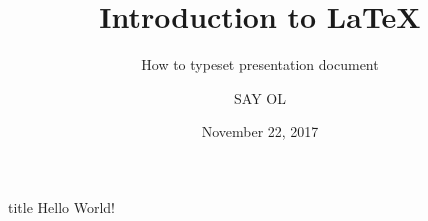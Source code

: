 \documentclass{beamer}
\title[I2L]{Introduction to \LaTeX{}}
\subtitle[Beamer]{How to typeset presentation document}
\author[SAY]{SAY OL}
\institute[KhTUG]{Khmer TeX Users Group}
\date[11/22/2017]{November 22, 2017}
\begin{document}
	\begin{frame}
	\maketitle
\end{frame}
\begin{frame}{title}
Hello World!
\end{frame}
\end{document}
